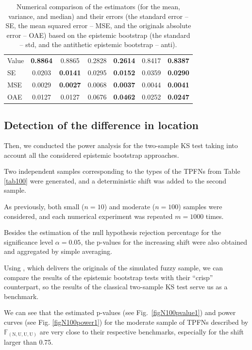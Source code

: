 \begin{table}[htbp]
\begin{tabular}{l|cc|cc|cc}
Value & \textbf{0.8864} & 0.8865 & 0.2828 & \textbf{0.2614} & 0.8417 & \textbf{0.8387} \\ 
  SE & 0.0203 & \textbf{0.0141} & 0.0295 & \textbf{0.0152} & 0.0359 & \textbf{0.0290} \\ 
  MSE & 0.0029 & \textbf{0.0027} & 0.0068 & \textbf{0.0037} & 0.0044 & \textbf{0.0041} \\ 
  OAE & 0.0127 & 0.0127 & 0.0676 & \textbf{0.0462} & 0.0252 & \textbf{0.0247} \\ 

   \hline
\end{tabular}
\caption{Numerical comparison of the estimators (for the mean, variance, and median) and their errors (the standard error -- SE, the mean squared error -- MSE, and the originals absolute error -- OAE) based on the epistemic bootstrap (the standard -- std, and the antithetic epistemic bootstrap -- anti).}\label{tab200}
\end{table}


\subsection{Detection of the difference in location}

Then, we conducted the power analysis for the two-sample KS test taking into account all the considered epistemic bootstrap approaches.

Two independent samples corresponding to the types of the TPFNs from Table \ref{tab100} were generated, and a deterministic shift was added to the second sample.

As previously, both small ($n=10$) and moderate ($n=100$) samples were considered, and each numerical experiment was repeated $m=1000$ times.

Besides the estimation of the null hypothesis rejection percentage for the significance level $\alpha =0.05$, the p-values for the increasing shift were also obtained and aggregated by simple averaging.

Using , which delivers the originals of the simulated fuzzy sample, we can compare the results of the epistemic bootstrap tests with their ``crisp'' counterpart, so the results of the classical two-sample KS test serve us as a benchmark.

We can see that the estimated p-values (see Fig.~\ref{figN100pvalue1}) and power curves (see Fig. \ref{figN100power1}) for the moderate sample of TPFNs described by $\mathbb{F}_{(\mathrm{N,U,U,U})}$ are very close to their respective benchmarks, especially for the shift larger than 0.75.

